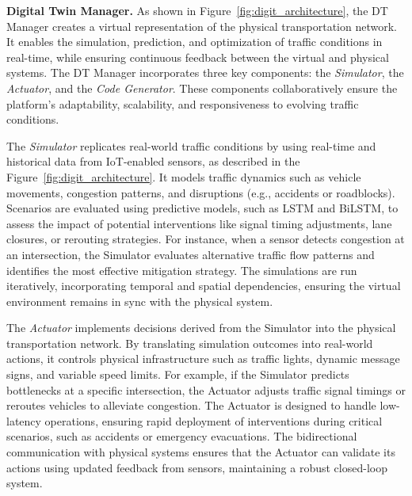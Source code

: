 \textbf{Digital Twin Manager.}  
As shown in Figure~\ref{fig:digit_architecture}, the DT Manager creates a virtual representation of the physical transportation network. It enables the simulation, prediction, and optimization of traffic conditions in real-time, while ensuring continuous feedback between the virtual and physical systems. The DT Manager incorporates three key components: the \textit{Simulator}, the \textit{Actuator}, and the \textit{Code Generator}. These components collaboratively ensure the platform's adaptability, scalability, and responsiveness to evolving traffic conditions.

The \textit{Simulator} replicates real-world traffic conditions by using real-time and historical data from IoT-enabled sensors, as described in the Figure~\ref{fig:digit_architecture}. It models traffic dynamics such as vehicle movements, congestion patterns, and disruptions (e.g., accidents or roadblocks). Scenarios are evaluated using predictive models, such as LSTM and BiLSTM, to assess the impact of potential interventions like signal timing adjustments, lane closures, or rerouting strategies. For instance, when a sensor detects congestion at an intersection, the Simulator evaluates alternative traffic flow patterns and identifies the most effective mitigation strategy. The simulations are run iteratively, incorporating temporal and spatial dependencies, ensuring the virtual environment remains in sync with the physical system.

The \textit{Actuator} implements decisions derived from the Simulator into the physical transportation network. By translating simulation outcomes into real-world actions, it controls physical infrastructure such as traffic lights, dynamic message signs, and variable speed limits. For example, if the Simulator predicts bottlenecks at a specific intersection, the Actuator adjusts traffic signal timings or reroutes vehicles to alleviate congestion. The Actuator is designed to handle low-latency operations, ensuring rapid deployment of interventions during critical scenarios, such as accidents or emergency evacuations. The bidirectional communication with physical systems ensures that the Actuator can validate its actions using updated feedback from sensors, maintaining a robust closed-loop system.

